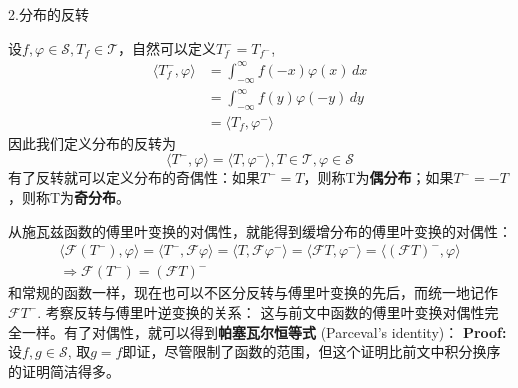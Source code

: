 \documentclass{ctexbook}
\begin{document}
\noindent 2.分布的反转

设$f,\varphi\in\mathcal{S} ,T_f\in\mathcal{T} $，自然可以定义$T_f^-=T_{f^-}$,
\begin{align*}
    \langle T_f^-,\varphi\rangle & =\int_{-\infty}^{\infty}f(-x)\varphi(x)\,dx \\
                                 & =\int_{-\infty}^{\infty}f(y)\varphi(-y)\,dy \\
                                 & =\langle T_f,\varphi^-\rangle
\end{align*}
因此我们定义分布的反转为
\begin{equation}
    \langle T^-,\varphi\rangle=\langle T,\varphi^-\rangle,T\in\mathcal{T} ,\varphi\in\mathcal{S}
\end{equation}
有了反转就可以定义分布的奇偶性：如果$T^-=T$，则称T为\textbf{偶分布}；如果$T^-=-T$
，则称T为\textbf{奇分布}。

从施瓦兹函数的傅里叶变换的对偶性，就能得到缓增分布的傅里叶变换的对偶性：
\begin{align*}
    \langle\mathcal{F}(T^-),\varphi\rangle=\langle T^-,\mathcal{F}\varphi\rangle=\langle T,\mathcal{F} \varphi^-\rangle=\langle\mathcal{F}T,\varphi^-\rangle=\langle(\mathcal{F}T)^-,\varphi\rangle \\
    \Rightarrow\mathcal{F}(T^-)= (\mathcal{F}T)^-
\end{align*}
和常规的函数一样，现在也可以不区分反转与傅里叶变换的先后，而统一地记作$\mathcal{F} T^-$.
考察反转与傅里叶逆变换的关系：
这与前文中函数的傅里叶变换对偶性完全一样。有了对偶性，就可以得到\textbf{帕塞瓦尔恒等式}
(Parceval's identity)：
\textbf{Proof:}设$f,g\in\mathcal{S} $,
取$g=f$即证，尽管限制了函数的范围，但这个证明比前文中积分换序的证明简洁得多。
\end{document}
